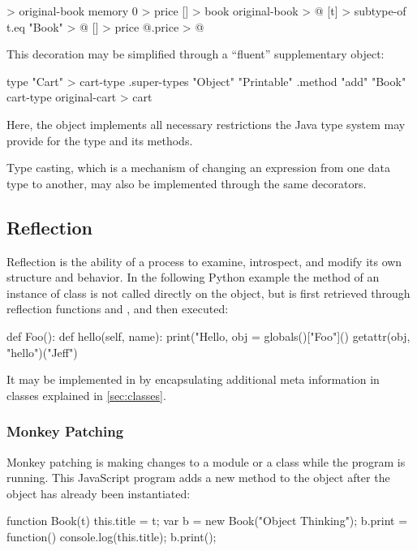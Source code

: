 \documentclass[sigplan,nonacm]{acmart}
\begin{document}
\begin{ffcode}
[] > original-book
  memory 0 > price
[] > book
  original-book > @
  [t] > subtype-of
    t.eq "Book" > @
  [] > price
    @.price > @
\end{ffcode}

This decoration may be simplified through a ``fluent'' supplementary object:

\begin{ffcode}
type "Cart" > cart-type
.super-types "Object" "Printable"
.method "add" "Book"
cart-type original-cart > cart
\end{ffcode}

Here, the  object implements all necessary restrictions the Java type system may provide for the type  and its methods.

Type casting, which is a mechanism of changing an expression from one data type to another, may also be implemented through the same decorators.

\subsection{Reflection}
\label{sec:reflection}

Reflection is the ability of a process to examine, introspect, and modify its own structure and behavior.
In the following Python example the method  of an instance of class  is not called directly on the object, but is first retrieved through reflection functions  and , and then executed:

\begin{ffcode}
def Foo():
    def hello(self, name):
        print("Hello, %
obj = globals()["Foo"]()
getattr(obj, "hello")("Jeff")
\end{ffcode}

It may be implemented in \eolang{} by encapsulating additional meta information in classes explained in \cref{sec:classes}.

\subsubsection{Monkey Patching}

Monkey patching is making changes to a module or a class while the program is running.
This JavaScript program adds a new method  to the object  after the object has already been instantiated:

\begin{ffcode}
function Book(t) { this.title = t; }
var b = new Book("Object Thinking");
b.print = function() {
  console.log(this.title);
}
b.print();
\end{ffcode}
\end{document}
